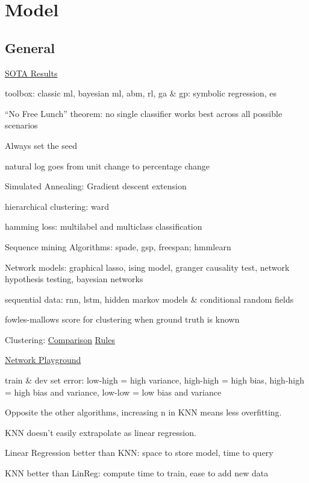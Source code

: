 \documentclass[]{book}
\begin{document}
\hypertarget{model}{%
\chapter{Model}\label{model}}

\hypertarget{general-3}{%
\section{General}\label{general-3}}

\href{https://paperswithcode.com/sota}{SOTA Results}

toolbox: classic ml, bayesian ml, abm, rl, ga \& gp: symbolic regression, es

``No Free Lunch'' theorem: no single classifier works best across all possible scenarios

Always set the seed

natural log goes from unit change to percentage change

Simulated Annealing: Gradient descent extension

hierarchical clustering: ward

hamming loss: multilabel and multiclass classification

Sequence mining Algorithms: spade, gsp, freespan; hmmlearn

Network models: graphical lasso, ising model, granger causality test, network hypothesis testing, bayesian networks

sequential data: rnn, lstm, hidden markov models \& conditional random fields

fowles-mallows score for clustering when ground truth is known

Clustering: \href{http://scikit-learn.org/stable/modules/clustering.html\#clustering}{Comparison} \textbar{} \href{https://twitter.com/thomaswdinsmore/status/965223193043718145}{Rules}

\href{https://mikedombo.github.io/graphPlayground/\#}{Network Playground}

train \& dev set error: low-high = high variance, high-high = high bias, high-high = high bias and variance, low-low = low bias and variance

Opposite the other algorithms, increasing n in KNN means less overfitting.

KNN doesn't easily extrapolate as linear regression.

Linear Regression better than KNN: space to store model, time to query

KNN better than LinReg: compute time to train, ease to add new data
\end{document}

